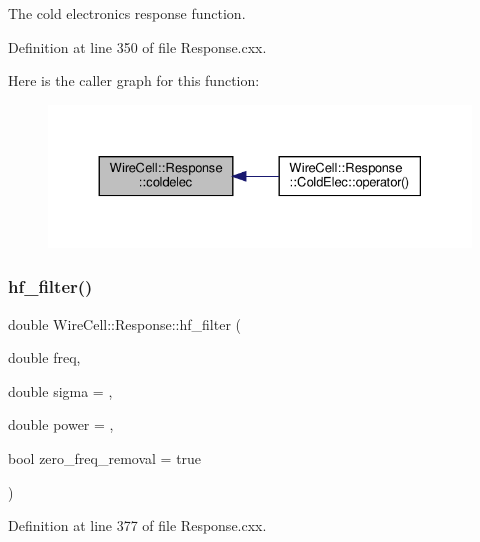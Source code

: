 The cold electronics response function. 



Definition at line 350 of file Response.\+cxx.

Here is the caller graph for this function\+:
\nopagebreak
\begin{figure}[H]
\begin{center}
\leavevmode
\includegraphics[width=330pt]{namespace_wire_cell_1_1_response_a4fc0f118f72199a91582863c978b803c_icgraph}
\end{center}
\end{figure}
\mbox{\label{namespace_wire_cell_1_1_response_a1a0252a5992f6d7cf76f5b1b0adcf544}} 
\subsubsection{\texorpdfstring{hf\+\_\+filter()}{hf\_filter()}}
{\footnotesize\ttfamily double Wire\+Cell\+::\+Response\+::hf\+\_\+filter (\begin{DoxyParamCaption}\item[{double}]{freq,  }\item[{double}]{sigma = {},  }\item[{double}]{power = {},  }\item[{bool}]{zero\+\_\+freq\+\_\+removal = {\ttfamily true} }\end{DoxyParamCaption})}



Definition at line 377 of file Response.\+cxx.

